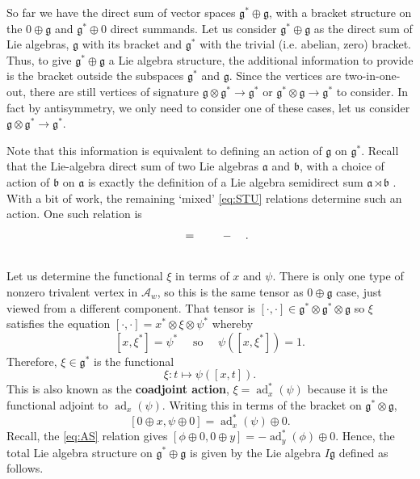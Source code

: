 So far we have the direct sum of vector spaces \(\mathfrak{g}^{\ast} \oplus \mathfrak{g}\), with a bracket structure on the \(0 \oplus \mathfrak{g}\) and \(\mathfrak{g}^{\ast} \oplus 0\) direct summands. Let us consider \(\mathfrak{g}^{\ast} \oplus \mathfrak{g}\) as the direct sum of Lie algebras, \(\mathfrak{g}\) with its bracket and \(\mathfrak{g}^{\ast}\) with the trivial (i.e. abelian, zero) bracket. Thus, to give \(\mathfrak{g}^{\ast} \oplus \mathfrak{g}\) a Lie algebra structure, the additional information to provide is the bracket outside the subspaces \(\mathfrak{g}^{\ast}\) and \(\mathfrak{g}\). Since the vertices are two-in-one-out, there  are still vertices of signature \(\mathfrak{g} \otimes \mathfrak{g}^{\ast} \to \mathfrak{g}^{\ast}\) or \(\mathfrak{g}^{\ast} \otimes \mathfrak{g} \to \mathfrak{g}^{\ast}\) to consider. In fact by antisymmetry, we only need to consider one of these cases, let us consider \(\mathfrak{g} \otimes \mathfrak{g}^{\ast} \to \mathfrak{g}^{\ast}\).

Note that this information is equivalent to defining an action of \(\mathfrak{g}\) on \(\mathfrak{g}^{\ast}\). Recall that the Lie-algebra direct sum of two Lie algebras \(\mathfrak{a}\) and \(\mathfrak{b}\), with a choice of action of \(\mathfrak{b}\) on \(\mathfrak{a}\) is exactly the definition of a Lie algebra semidirect sum \(\mathfrak{a} \rtimes \mathfrak{b}\) \cite{a-note-on-semidirect-sum-of-lie-algebras}. With a bit of work, the remaining `mixed' \ref{eq:STU} relations determine such an action. One such relation is
\[
	\def\svgscale{0.3} \raisebox{-20pt}{}
	\quad
	=
	\quad
	\def\svgscale{0.3} \raisebox{-20pt}{}
	\quad
	-
	\quad
	\def\svgscale{0.3} \raisebox{-20pt}{}.
\]
Let us determine the functional \(\xi\) in terms of \(x\) and \(\psi\). There is only one type of nonzero trivalent vertex in \(\mathcal{A}_{w}\), so this is the same tensor as \(0 \oplus \mathfrak{g}\) case, just viewed from a different component. That tensor is \([\cdot, \cdot] \in \mathfrak{g}^{\ast} \otimes \mathfrak{g}^{\ast} \otimes \mathfrak{g}\) so \(\xi\) satisfies the equation \([\cdot, \cdot] = x^{\ast} \otimes \xi \otimes \psi^{\ast}\) whereby
\[[x, \xi^{\ast}] = \psi^{\ast} \quad \text{ so } \quad \psi([x, \xi^{\ast}]) = 1.\]
Therefore, \(\xi \in \mathfrak{g}^{\ast}\) is the functional
\[\xi : t \longmapsto \psi([x, t]).\]
This is also known as the \textbf{coadjoint action}, \(\xi = \operatorname{ad}^{\ast}_{x}(\psi)\) because it is the functional adjoint to \(\operatorname{ad}_{x}(\psi)\). Writing this in terms of the bracket on \(\mathfrak{g}^{\ast} \otimes \mathfrak{g}\),
\[[0 \oplus x, \psi \oplus 0] = \operatorname{ad}^{\ast}_{x}(\psi) \oplus 0.\]
Recall, the \ref{eq:AS} relation gives \([\phi \oplus 0, 0 \oplus y] = -\operatorname{ad}^{\ast}_{y}(\phi) \oplus 0\). Hence, the total Lie algebra structure on \(\mathfrak{g}^{\ast} \oplus \mathfrak{g}\) is given by the Lie algebra \(I\mathfrak{g}\) defined as follows.

